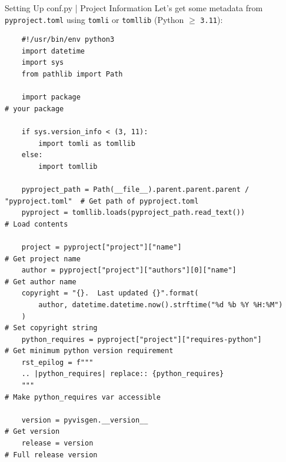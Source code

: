 \begin{darkframe}[fragile]{Setting Up conf.py | Project Information}
  \vspace*{0.25cm}
  Let's get some metadata from \texttt{pyproject.toml} using \texttt{tomli} or \texttt{tomllib} (Python $\geqslant$ \texttt{3.11}):\\[0.25\baselineskip]
  \footnotesize
  \begin{verbatim}
    #!/usr/bin/env python3
    import datetime
    import sys
    from pathlib import Path

    import package                                                           # your package

    if sys.version_info < (3, 11):
        import tomli as tomllib
    else:
        import tomllib

    pyproject_path = Path(__file__).parent.parent.parent / "pyproject.toml"  # Get path of pyproject.toml
    pyproject = tomllib.loads(pyproject_path.read_text())                    # Load contents

    project = pyproject["project"]["name"]                                   # Get project name
    author = pyproject["project"]["authors"][0]["name"]                      # Get author name
    copyright = "{}.  Last updated {}".format(
        author, datetime.datetime.now().strftime("%d %b %Y %H:%M")
    )                                                                        # Set copyright string
    python_requires = pyproject["project"]["requires-python"]                # Get minimum python version requirement
    rst_epilog = f"""
    .. |python_requires| replace:: {python_requires}
    """                                                                      # Make python_requires var accessible

    version = pyvisgen.__version__                                           # Get version
    release = version                                                        # Full release version
  \end{verbatim}
\end{darkframe}


